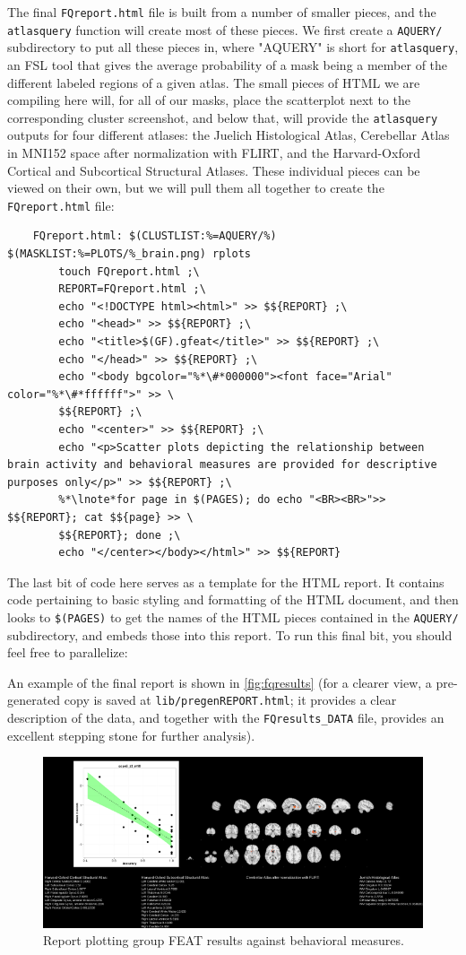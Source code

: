 The final \texttt{FQreport.html} file is built from a number of smaller pieces, and the \texttt{atlasquery} function will create most of these pieces. We first create a \texttt{AQUERY/} subdirectory to put all these pieces in, where "AQUERY" is short for \texttt{atlasquery}, an FSL tool that gives the average probability of a mask being a member of the different labeled regions of a given atlas. The small pieces of HTML we are compiling here will, for all of our masks, place the scatterplot next to the corresponding cluster screenshot, and below that, will provide the \texttt{atlasquery} outputs for four different atlases: the Juelich Histological Atlas, Cerebellar Atlas in MNI152 space after normalization with FLIRT, and the Harvard-Oxford Cortical and Subcortical Structural Atlases. These individual pieces can be viewed on their own, but we will pull them all together to create the \texttt{FQreport.html} file:

\begin{lstlisting}
	FQreport.html: $(CLUSTLIST:%=AQUERY/%) $(MASKLIST:%=PLOTS/%_brain.png) rplots
		touch FQreport.html ;\
		REPORT=FQreport.html ;\
		echo "<!DOCTYPE html><html>" >> $${REPORT} ;\
		echo "<head>" >> $${REPORT} ;\
		echo "<title>$(GF).gfeat</title>" >> $${REPORT} ;\
		echo "</head>" >> $${REPORT} ;\
		echo "<body bgcolor="%*\#*000000"><font face="Arial" color="%*\#*ffffff">" >> \
		$${REPORT} ;\
		echo "<center>" >> $${REPORT} ;\
		echo "<p>Scatter plots depicting the relationship between brain activity and behavioral measures are provided for descriptive purposes only</p>" >> $${REPORT} ;\
		%*\lnote*for page in $(PAGES); do echo "<BR><BR>">> $${REPORT}; cat $${page} >> \
		$${REPORT}; done ;\
		echo "</center></body></html>" >> $${REPORT}
\end{lstlisting}

The last bit of code here serves as a template for the HTML report. It contains code pertaining to basic styling and formatting of the HTML document, and  then looks to \texttt{\$(PAGES)} to get the names of the HTML pieces contained in the \texttt{AQUERY/} subdirectory, and embeds those into this report. To run this final bit, you should feel free to parallelize:
\bashcmd{make -f ../makefiles/Makefile.gfeat group3 -k -j}

An example of the final report is shown in \autoref{fig:fqresults} (for a clearer view, a pre-generated copy is saved at \texttt{lib/pregenREPORT.html}; it provides a clear description of the data, and together with the \texttt{FQresults_DATA} file, provides an excellent stepping stone for further analysis).

\begin{figure}
	\begin{center}
          \includegraphics[scale=.6]{images/SSreport.png}
		\caption{Report plotting group FEAT results against behavioral measures.}
                \label{fig:fqresults}
	\end{center}
\end{figure}

